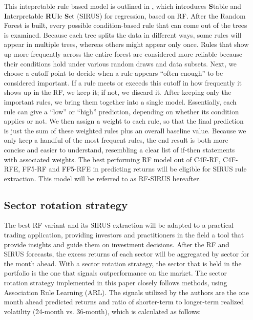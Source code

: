 This intepretable rule based model is outlined in , which introduces \textbf{S}table and \textbf{I}nterpretable \textbf{RU}le \textbf{S}et (SIRUS) for regression, based on RF. After the Random Forest is built, every possible condition-based rule that can come out of the trees is examined. Because each tree splits the data in different ways, some rules will appear in multiple trees, whereas others might appear only once. Rules that show up more frequently across the entire forest are considered more reliable because their conditions hold under various random draws and data subsets. Next, we choose a cutoff point to decide when a rule appears “often enough” to be considered important. If a rule meets or exceeds this cutoff in how frequently it shows up in the RF, we keep it; if not, we discard it. After keeping only the important rules, we bring them together into a single model. Essentially, each rule can give a “low” or “high” prediction, depending on whether its condition applies or not. We then assign a weight to each rule, so that the final prediction is just the sum of these weighted rules plus an overall baseline value. Because we only keep a handful of the most frequent rules, the end result is both more concise and easier to understand, resembling a clear list of if-then statements with associated weights. The best performing RF model out of C4F-RF, C4F-RFE, FF5-RF and FF5-RFE in predicting returns will be eligible for SIRUS rule extraction. This model will be referred to as RF-SIRUS hereafter.
 

\subsection{Sector rotation strategy}
The best RF variant and its SIRUS extraction will be adapted to a practical trading application, providing investors and practitioners in the field a tool that provide insights and guide them on investment decisions. After the RF and SIRUS forecasts, the excess returns of each sector will be aggregated by sector for the month ahead. With a sector rotation strategy, the sector that is held in the portfolio is the one that signals outperformance on the market. The sector rotation strategy implemented in this paper closely follows  methods, using Association Rule Learning (ARL). The signals utilized by the authors are the one month ahead predicted returns and ratio of shorter-term to longer-term realized volatility (24-month vs. 36-month), which is calculated as follows:

